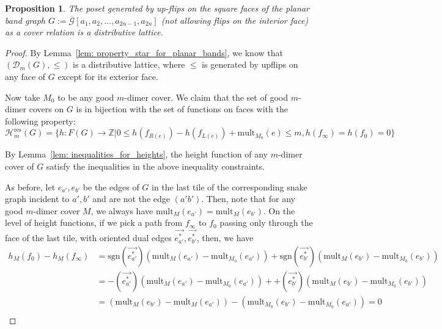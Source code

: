 \documentclass[11pt]{amsart}
\newtheorem{prop}[thm]{Proposition}
\theoremstyle{definition}
\theoremstyle{remark}
\numberwithin{equation}{section}
\begin{document}
\begin{prop}\label{prop: lattice_structure_of_good_m_covers}
    The poset generated by up-flips on the square faces of the planar band graph $G:= \overline{\mathcal{G}}[a_1,a_2,...,a_{2n-1},a_{2n}]$ (not allowing flips on the interior face) as a cover relation is a distributive lattice.   
\end{prop}
\begin{proof}
    By Lemma~\ref{lem: property_star_for_planar_bands}, we know that $(\mathcal{D}_{m}(G), \leq)$ is a distributive lattice, where $\leq$ is generated by upflips on any face of $G$ except for its exterior face.
    
    Now take $M_0$ to be any good $m$-dimer cover. We claim that the set of good $m$-dimer covers on $G$ is in bijection with the set of functions on faces with the following property:
    $$\mathcal{H}^{\text{res}}_m(G) = \{h: F(G)\rightarrow \mathbb{Z}| 0\leq h(f_{R(e)}) -h(f_{L(e)})+\text{mult}_{M_0}(e)\leq m, h(f_{\infty}) = h(f_0) = 0 \}$$

    By Lemma~\ref{lem: inequalities_for_heights}, the height function of any $m$-dimer cover of $G$ satisfy the inequalities in the above inequality constraints.
    
    As before, let $e_{a'}, e_{b'}$ be the edges of $G$ in the last tile of the corresponding snake graph incident to $a',b'$ and are not the edge $(a'b')$. Then, note that for any good $m$-dimer cover $M$, we always have $\text{mult}_{M}(e_{a'}) = \text{mult}_{M}(e_{b'})$. On the level of height functions, if we pick a path from $f_\infty$ to $f_0$ passing only through the face of the last tile, with oriented dual edges $\Vec{e^*_{a'}}, \Vec{e^*_{b'}}$, then, we have 
    \begin{equation}
        \begin{split}
            h_M(f_0) - h_M(f_\infty)&= \text{sgn}(\Vec{e^*_{a'}})(\text{mult}_{M}(e_{a'})-\text{mult}_{M_0}(e_{a'}))+ \text{sgn}(\Vec{e^*_{b'}})(\text{mult}_{M}(e_{b'})-\text{mult}_{M_0}(e_{b'}))\\
            &= -(\Vec{e^*_{a'}})(\text{mult}_{M}(e_{a'})-\text{mult}_{M_0}(e_{a'}))+ +(\Vec{e^*_{b'}})(\text{mult}_{M}(e_{b'})-\text{mult}_{M_0}(e_{b'}))\\
            &= (\text{mult}_{M}(e_{b'})-\text{mult}_{M}(e_{a'})) - (\text{mult}_{M_0}(e_{b'})-\text{mult}_{M_0}(e_{a'}))=0\\
        \end{split}
    \end{equation}


\end{proof}
\end{document}

